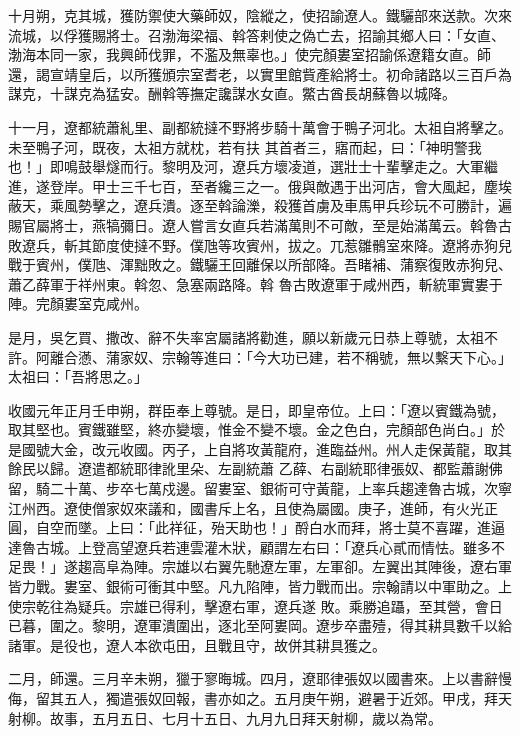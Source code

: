 \begin{pinyinscope}
 十月朔，克其城，獲防禦使大藥師奴，陰縱之，使招諭遼人。鐵驪部來送款。次來流城，以俘獲賜將士。召渤海梁福、斡答剌使之偽亡去，招諭其鄉人曰：「女直、渤海本同一家，我興師伐罪，不濫及無辜也。」使完顏婁室招諭係遼籍女直。師還，謁宣靖皇后，以所獲頒宗室耆老，以實里館貲產給將士。初命諸路以三百戶為謀克，十謀克為猛安。酬斡等撫定讒謀水女直。鱉古酋長胡蘇魯以城降。



 十一月，遼都統蕭糺里、副都統撻不野將步騎十萬會于鴨子河北。太祖自將擊之。未至鴨子河，既夜，太祖方就枕，若有扶
 其首者三，寤而起，曰：「神明警我也！」即鳴鼓舉燧而行。黎明及河，遼兵方壞凌道，選壯士十輩擊走之。大軍繼進，遂登岸。甲士三千七百，至者纔三之一。俄與敵遇于出河店，會大風起，塵埃蔽天，乘風勢擊之，遼兵潰。逐至斡論濼，殺獲首虜及車馬甲兵珍玩不可勝計，遍賜官屬將士，燕犒彌日。遼人嘗言女直兵若滿萬則不可敵，至是始滿萬云。斡魯古敗遼兵，斬其節度使撻不野。僕虺等攻賓州，拔之。兀惹雛鶻室來降。遼將赤狗兒戰于賓州，僕虺、渾黜敗之。鐵驪王回離保以所部降。吾睹補、蒲察復敗赤狗兒、蕭乙薛軍于祥州東。斡忽、急塞兩路降。斡
 魯古敗遼軍于咸州西，斬統軍實婁于陣。完顏婁室克咸州。



 是月，吳乞買、撒改、辭不失率宮屬諸將勸進，願以新歲元日恭上尊號，太祖不許。阿離合懣、蒲家奴、宗翰等進曰：「今大功已建，若不稱號，無以繫天下心。」太祖曰：「吾將思之。」



 收國元年正月壬申朔，群臣奉上尊號。是日，即皇帝位。上曰：「遼以賓鐵為號，取其堅也。賓鐵雖堅，終亦變壞，惟金不變不壞。金之色白，完顏部色尚白。」於是國號大金，改元收國。丙子，上自將攻黃龍府，進臨益州。州人走保黃龍，取其餘民以歸。遼遣都統耶律訛里朵、左副統蕭
 乙薛、右副統耶律張奴、都監蕭謝佛留，騎二十萬、步卒七萬戍邊。留婁室、銀術可守黃龍，上率兵趨達魯古城，次寧江州西。遼使僧家奴來議和，國書斥上名，且使為屬國。庚子，進師，有火光正圓，自空而墜。上曰：「此祥征，殆天助也！」酹白水而拜，將士莫不喜躍，進逼達魯古城。上登高望遼兵若連雲灌木狀，顧謂左右曰：「遼兵心貳而情怯。雖多不足畏！」遂趨高阜為陣。宗雄以右翼先馳遼左軍，左軍卻。左翼出其陣後，遼右軍皆力戰。婁室、銀術可衝其中堅。凡九陷陣，皆力戰而出。宗翰請以中軍助之。上使宗乾往為疑兵。宗雄已得利，擊遼右軍，遼兵遂
 敗。乘勝追躡，至其營，會日已暮，圍之。黎明，遼軍潰圍出，逐北至阿婁岡。遼步卒盡殪，得其耕具數千以給諸軍。是役也，遼人本欲屯田，且戰且守，故併其耕具獲之。



 二月，師還。三月辛未朔，獵于寥晦城。四月，遼耶律張奴以國書來。上以書辭慢侮，留其五人，獨遣張奴回報，書亦如之。五月庚午朔，避暑于近郊。甲戌，拜天射柳。故事，五月五日、七月十五日、九月九日拜天射柳，歲以為常。




\end{pinyinscope}
